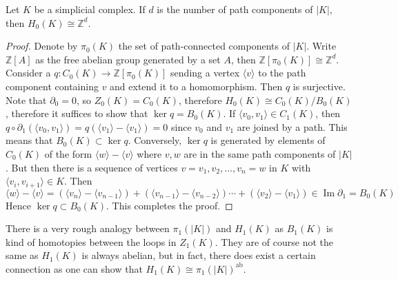 \begin{lemma}
    Let $K$ be a simplicial complex.
    If $d$ is the number of path components of $|K|$, then $H_0(K)\cong\mathbb Z^d$.
\end{lemma}
\begin{proof}
    Denote by $\pi_0(K)$ the set of path-connected components of $|K|$.
    Write $\mathbb Z[A]$ as the free abelian group generated by a set $A$, then $\mathbb Z[\pi_0(K)]\cong\mathbb Z^d$.
    Consider a $q:C_0(K)\to\mathbb Z[\pi_0(K)]$ sending a vertex $\langle v\rangle$ to the path component containing $v$ and extend it to a homomorphism.
    Then $q$ is surjective.
    Note that $\partial_0=0$, so $Z_0(K)=C_0(K)$, therefore $H_0(K)\cong C_0(K)/B_0(K)$, therefore it suffices to show that $\ker q=B_0(K)$.
    If $\langle v_0,v_1\rangle\in C_1(K)$, then $q\circ\partial_1(\langle v_0,v_1\rangle)=q(\langle v_1\rangle-\langle v_1\rangle)=0$ since $v_0$ and $v_1$ are joined by a path.
    This means that $B_0(K)\subset\ker q$.
    Conversely, $\ker q$ is generated by elements of $C_0(K)$ of the form $\langle w\rangle-\langle v\rangle$ where $v,w$ are in the same path components of $|K|$.
    But then there is a sequence of vertices $v=v_1,v_2,\ldots,v_n=w$ in $K$ with $\langle v_i,v_{i+1}\rangle\in K$.
    Then
    $$\langle w\rangle-\langle v\rangle=(\langle v_n\rangle-\langle v_{n-1}\rangle)+(\langle v_{n-1}\rangle-\langle v_{n-2}\rangle)\cdots +(\langle v_2\rangle-\langle v_1\rangle)\in\operatorname{Im}\partial_1=B_0(K)$$
    Hence $\ker q\subset B_0(K)$.
    This completes the proof.
\end{proof}
\begin{remark}
    There is a very rough analogy between $\pi_1(|K|)$ and $H_1(K)$ as $B_1(K)$ is kind of homotopies between the loops in $Z_1(K)$.
    They are of course not the same as $H_1(K)$ is always abelian, but in fact, there does exist a certain connection as one can show that $H_1(K)\cong\pi_1(|K|)^{\operatorname{ab}}$.
\end{remark}
